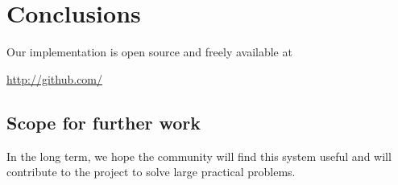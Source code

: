 \chapter{Conclusions}
\label{chap:conclusion}

Our implementation is open source and freely available at
\begin{center}
\url{http://github.com/}
\end{center}

\section{Scope for further work}

In the long term, we hope the community will find this system useful and will
contribute to the project to solve large practical problems.
